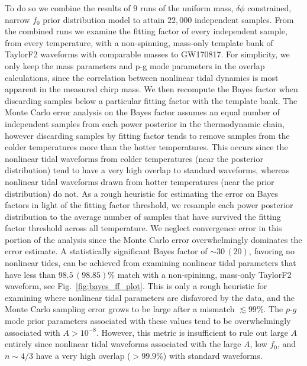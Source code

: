 To do so we combine the results of $9$ runs of the uniform mass, $\delta \phi$ constrained, narrow $f_0$ prior distribution model to attain $22,000$ independent samples. From the combined runs we examine the fitting factor of every independent sample, from every temperature, with a non-spinning, mass-only template bank of TaylorF2 waveforms with comparable masses to GW170817. For simplicity, we only keep the mass parameters and p-g mode parameters in the overlap calculations, since the correlation between nonlinear tidal dynamics is most apparent in the measured chirp mass. We then recompute the Bayes factor when discarding samples below a particular fitting factor with the template bank. The Monte Carlo error analysis on the Bayes factor assumes an equal number of independent samples from each power posterior in the thermodynamic chain, however discarding samples by fitting factor tends to remove samples from the colder temperatures more than the hotter temperatures. This occurs since the nonlinear tidal waveforms from colder temperatures (near the posterior distribution) tend to have a very high overlap to standard waveforms, whereas nonlinear tidal waveforms drawn from hotter temperatures (near the prior distribution) do not. As a rough heuristic for estimating the error on Bayes factors in light of the fitting factor threshold, we resample each power posterior distribution to the average number of samples that have survived the fitting factor threshold across all temperature. We neglect convergence error in this portion of the analysis since the Monte Carlo error overwhelmingly dominates the error estimate. A statistically significant Bayes factor of $\sim 30 \, (20)$, favoring no nonlinear tides, can be achieved from examining nonlinear tidal parameters that have less than $98.5 \, (98.85)$\% match with a non-spininng, mass-only TaylorF2 waveform, see Fig.~\ref{fig:bayes_ff_plot}. This is only a rough heuristic for examining where nonlinear tidal parameters are disfavored by the data, and the Monte Carlo sampling error grows to be large after a mismatch $\lesssim 99$\%. The $p$-$g$ mode prior parameters associated with these values tend to be overwhelmingly associated with $A > 10^{-8}$. However, this metric is insufficient to rule out large $A$ entirely since  nonlinear tidal waveforms associated with the large $A$, low $f_0$, and $n \sim 4/3$ have a very high overlap ($> 99.9\%$) with standard waveforms.

